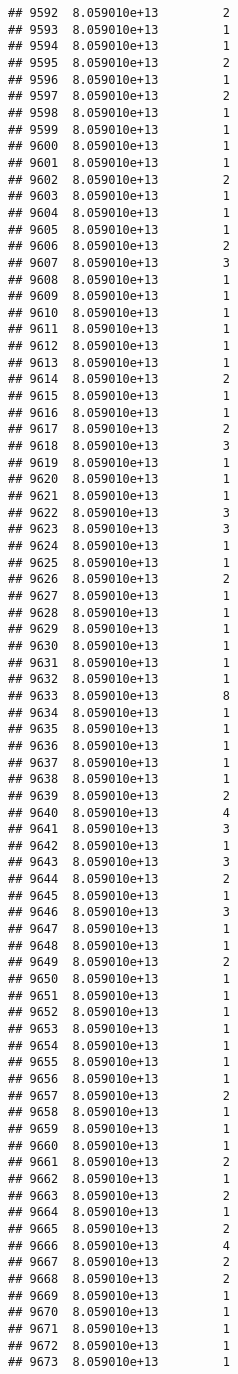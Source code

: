 \documentclass[
]{article}
\begin{document}
\begin{verbatim}
## 9592  8.059010e+13         2
## 9593  8.059010e+13         1
## 9594  8.059010e+13         1
## 9595  8.059010e+13         2
## 9596  8.059010e+13         1
## 9597  8.059010e+13         2
## 9598  8.059010e+13         1
## 9599  8.059010e+13         1
## 9600  8.059010e+13         1
## 9601  8.059010e+13         1
## 9602  8.059010e+13         2
## 9603  8.059010e+13         1
## 9604  8.059010e+13         1
## 9605  8.059010e+13         1
## 9606  8.059010e+13         2
## 9607  8.059010e+13         3
## 9608  8.059010e+13         1
## 9609  8.059010e+13         1
## 9610  8.059010e+13         1
## 9611  8.059010e+13         1
## 9612  8.059010e+13         1
## 9613  8.059010e+13         1
## 9614  8.059010e+13         2
## 9615  8.059010e+13         1
## 9616  8.059010e+13         1
## 9617  8.059010e+13         2
## 9618  8.059010e+13         3
## 9619  8.059010e+13         1
## 9620  8.059010e+13         1
## 9621  8.059010e+13         1
## 9622  8.059010e+13         3
## 9623  8.059010e+13         3
## 9624  8.059010e+13         1
## 9625  8.059010e+13         1
## 9626  8.059010e+13         2
## 9627  8.059010e+13         1
## 9628  8.059010e+13         1
## 9629  8.059010e+13         1
## 9630  8.059010e+13         1
## 9631  8.059010e+13         1
## 9632  8.059010e+13         1
## 9633  8.059010e+13         8
## 9634  8.059010e+13         1
## 9635  8.059010e+13         1
## 9636  8.059010e+13         1
## 9637  8.059010e+13         1
## 9638  8.059010e+13         1
## 9639  8.059010e+13         2
## 9640  8.059010e+13         4
## 9641  8.059010e+13         3
## 9642  8.059010e+13         1
## 9643  8.059010e+13         3
## 9644  8.059010e+13         2
## 9645  8.059010e+13         1
## 9646  8.059010e+13         3
## 9647  8.059010e+13         1
## 9648  8.059010e+13         1
## 9649  8.059010e+13         2
## 9650  8.059010e+13         1
## 9651  8.059010e+13         1
## 9652  8.059010e+13         1
## 9653  8.059010e+13         1
## 9654  8.059010e+13         1
## 9655  8.059010e+13         1
## 9656  8.059010e+13         1
## 9657  8.059010e+13         2
## 9658  8.059010e+13         1
## 9659  8.059010e+13         1
## 9660  8.059010e+13         1
## 9661  8.059010e+13         2
## 9662  8.059010e+13         1
## 9663  8.059010e+13         2
## 9664  8.059010e+13         1
## 9665  8.059010e+13         2
## 9666  8.059010e+13         4
## 9667  8.059010e+13         2
## 9668  8.059010e+13         2
## 9669  8.059010e+13         1
## 9670  8.059010e+13         1
## 9671  8.059010e+13         1
## 9672  8.059010e+13         1
## 9673  8.059010e+13         1

\end{verbatim}
\end{document}
